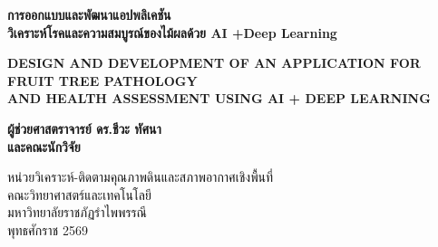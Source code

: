 \begin{titlepage}
\begin{center}
  \vspace*{1.2cm}

  {\fontsize{20pt}{26pt}\selectfont\bfseries การออกแบบและพัฒนาแอปพลิเคชัน\\วิเคราะห์โรคและความสมบูรณ์ของไม้ผลด้วย AI +Deep Learning\par}
  \vspace{0.4cm}
  {\fontsize{12pt}{16pt}\selectfont\color{rbruDarkGreen}\bfseries DESIGN AND DEVELOPMENT OF AN APPLICATION FOR FRUIT TREE PATHOLOGY\\AND HEALTH ASSESSMENT USING AI + DEEP LEARNING\par}

  \vspace{2.2cm}

  {\fontsize{14pt}{20pt}\selectfont\bfseries
  ผู้ช่วยศาสตราจารย์ ดร.ชีวะ ทัศนา\\
  และคณะนักวิจัย\par}

  \vfill

  {\fontsize{11pt}{16pt}\selectfont
  หน่วยวิเคราะห์-ติดตามคุณภาพดินและสภาพอากาศเชิงพื้นที่\\
  คณะวิทยาศาสตร์และเทคโนโลยี\\
  มหาวิทยาลัยราชภัฏรำไพพรรณี\\
  พุทธศักราช 2569\par}
\end{center}
\end{titlepage}
